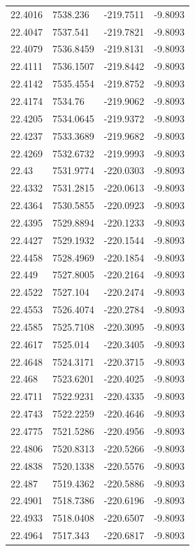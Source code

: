 \begin{table}[H]
\begin{tabular}{llll}
22.4016 & 7538.236 & -219.7511 & -9.8093 \\
22.4047 & 7537.541 & -219.7821 & -9.8093 \\
22.4079 & 7536.8459 & -219.8131 & -9.8093 \\
22.4111 & 7536.1507 & -219.8442 & -9.8093 \\
22.4142 & 7535.4554 & -219.8752 & -9.8093 \\
22.4174 & 7534.76 & -219.9062 & -9.8093 \\
22.4205 & 7534.0645 & -219.9372 & -9.8093 \\
22.4237 & 7533.3689 & -219.9682 & -9.8093 \\
22.4269 & 7532.6732 & -219.9993 & -9.8093 \\
22.43 & 7531.9774 & -220.0303 & -9.8093 \\
22.4332 & 7531.2815 & -220.0613 & -9.8093 \\
22.4364 & 7530.5855 & -220.0923 & -9.8093 \\
22.4395 & 7529.8894 & -220.1233 & -9.8093 \\
22.4427 & 7529.1932 & -220.1544 & -9.8093 \\
22.4458 & 7528.4969 & -220.1854 & -9.8093 \\
22.449 & 7527.8005 & -220.2164 & -9.8093 \\
22.4522 & 7527.104 & -220.2474 & -9.8093 \\
22.4553 & 7526.4074 & -220.2784 & -9.8093 \\
22.4585 & 7525.7108 & -220.3095 & -9.8093 \\
22.4617 & 7525.014 & -220.3405 & -9.8093 \\
22.4648 & 7524.3171 & -220.3715 & -9.8093 \\
22.468 & 7523.6201 & -220.4025 & -9.8093 \\
22.4711 & 7522.9231 & -220.4335 & -9.8093 \\
22.4743 & 7522.2259 & -220.4646 & -9.8093 \\
22.4775 & 7521.5286 & -220.4956 & -9.8093 \\
22.4806 & 7520.8313 & -220.5266 & -9.8093 \\
22.4838 & 7520.1338 & -220.5576 & -9.8093 \\
22.487 & 7519.4362 & -220.5886 & -9.8093 \\
22.4901 & 7518.7386 & -220.6196 & -9.8093 \\
22.4933 & 7518.0408 & -220.6507 & -9.8093 \\
22.4964 & 7517.343 & -220.6817 & -9.8093 \\

\end{tabular}
\end{table}
